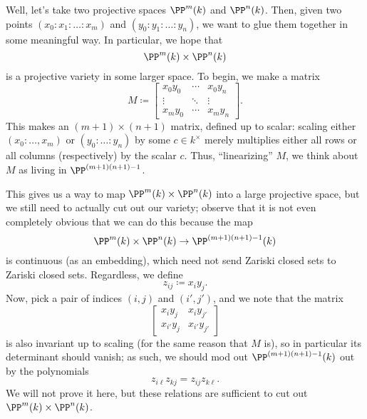\documentclass[../notes.tex]{subfiles}
\begin{document}
Well, let's take two projective spaces $\PP^m(k)$ and $\PP^n(k)$. Then, given two points $(x_0:x_1:\ldots:x_m)$ and $(y_0:y_1:\ldots:y_n)$, we want to glue them together in some meaningful way. In particular, we hope that
\[\PP^m(k)\times\PP^n(k)\]
is a projective variety in some larger space. To begin, we make a matrix
\[M\coloneqq\begin{bmatrix}
	x_0y_0 & \cdots & x_0y_n \\
	\vdots & \ddots & \vdots \\
	x_my_0 & \cdots & x_my_n
\end{bmatrix}.\]
This makes an $(m+1)\times(n+1)$ matrix, defined up to scalar: scaling either $(x_0:\ldots,x_m)$ or $(y_0:\ldots:y_n)$ by some $c\in k^\times$ merely multiplies either all rows or all columns (respectively) by the scalar $c$. Thus, ``linearizing'' $M$, we think about $M$ as living in $\PP^{(m+1)(n+1)-1}$.

This gives us a way to map $\PP^m(k)\times\PP^n(k)$ into a large projective space, but we still need to actually cut out our variety; observe that it is not even completely obvious that we can do this because the map
\[\PP^m(k)\times\PP^n(k)\to\PP^{(m+1)(n+1)-1}(k)\]
is continuous (as an embedding), which need not send Zariski closed sets to Zariski closed sets.
Regardless, we define
\[z_{ij}\coloneqq x_iy_j.\]
Now, pick a pair of indices $(i,j)$ and $(i',j')$, and we note that the matrix
\[\begin{bmatrix}
	x_iy_j & x_iy_{j'} \\
	x_{i'}y_j & x_{i'}y_{j'}
\end{bmatrix}\]
is also invariant up to scaling (for the same reason that $M$ is), so in particular its determinant should vanish; as such, we should mod out $\PP^{(m+1)(n+1)-1}(k)$ out by the polynomials
\[z_{i\ell}z_{kj}=z_{ij}z_{k\ell}.\]
We will not prove it here, but these relations are sufficient to cut out $\PP^m(k)\times\PP^n(k)$.
\end{document}
